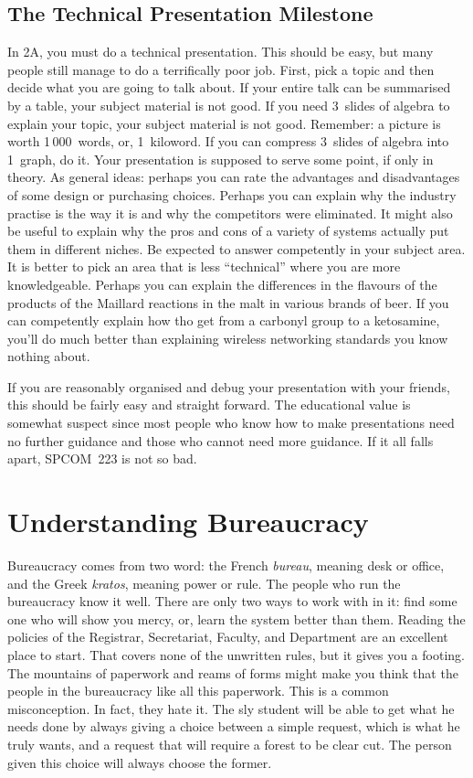 \documentclass{book}
\begin{document}
\section{The Technical Presentation Milestone}
In 2A, you must do a technical presentation. This should be easy, but many people still manage to do a terrifically poor job. First, pick a topic and then decide what you are going to talk about. If your entire talk can be summarised by a table, your subject material is not good. If you need 3~slides of algebra to explain your topic, your subject material is not good. Remember: a picture is worth 1\,000~words, or, 1~kiloword. If you can compress 3~slides of algebra into 1~graph, do it. Your presentation is supposed to serve some point, if only in theory. As general ideas: perhaps you can rate the advantages and disadvantages of some design or purchasing choices. Perhaps you can explain why the industry practise is the way it is and why the competitors were eliminated. It might also be useful to explain why the pros and cons of a variety of systems actually put them in different niches. Be expected to answer competently in your subject area. It is better to pick an area that is less ``technical'' where you are more knowledgeable. Perhaps you can explain the differences in the flavours of the products of the Maillard reactions in the malt in various brands of beer. If you can competently explain how tho get from a carbonyl group to a ketosamine, you'll do much better than explaining wireless networking standards you know nothing about.

If you are reasonably organised and debug your presentation with your friends, this should be fairly easy and straight forward. The educational value is somewhat suspect since most people who know how to make presentations need no further guidance and those who cannot need more guidance. If it all falls apart, SPCOM~223 is not so bad.

\chapter{Understanding Bureaucracy}
Bureaucracy comes from two word: the French \textsl{bureau}, meaning desk or office, and the Greek \textsl{kratos}, meaning power or rule. The people who run the bureaucracy know it well. There are only two ways to work with in it: find some one who will show you mercy, or, learn the system better than them. Reading the policies of the Registrar, Secretariat, Faculty, and Department are an excellent place to start. That covers none of the unwritten rules, but it gives you a footing. The mountains of paperwork and reams of forms might make you think that the people in the bureaucracy like all this paperwork. This is a common misconception. In fact, they hate it. The sly student will be able to get what he needs done by always giving a choice between a simple request, which is what he truly wants, and a request that will require a forest to be clear cut. The person given this choice will always choose the former.
\end{document}
